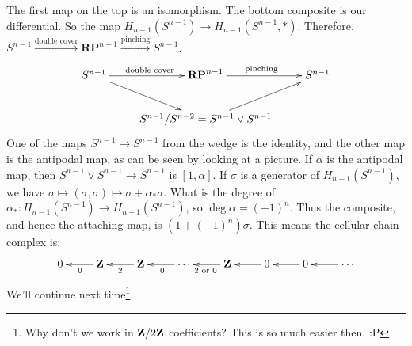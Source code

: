 The first map on the top is an isomorphism. The bottom composite is our differential. So the map $ H_{n-1}(S^{n-1})\to H_{n-1}(S^{n-1},\ast)$. Therefore, $S^{n-1}\xrightarrow{\text{double cover}}\mathbf{RP}^{n-1}\xrightarrow{\text{pinching}} S^{n-1}$.
\begin{equation*}
\xymatrix{S^{n-1}\ar[r]^{\text{double cover}}\ar[dr] & \mathbf{RP}^{n-1}\ar[r]^{\text{pinching}} & S^{n-1}\\
 & S^{n-1}/S^{n-2}=S^{n-1}\vee S^{n-1}\ar[ur]}
\end{equation*}
One of the maps $S^{n-1}\to S^{n-1}$ from the wedge is the identity, and the other map is the antipodal map, as can be seen by looking at a picture. If $\alpha$ is the antipodal map, then $S^{n-1}\vee S^{n-1}\to S^{n-1}$ is $[1,\alpha]$. If $\sigma$ is a generator of $ H_{n-1}(S^{n-1})$, we have $\sigma\mapsto (\sigma,\sigma)\mapsto \sigma+\alpha_\ast\sigma$. What is the degree of $\alpha_\ast: H_{n-1}(S^{n-1})\to H_{n-1}(S^{n-1})$, so $\deg\alpha=(-1)^n$. Thus the composite, and hence the attaching map, is $(1+(-1)^n)\sigma$. This means the cellular chain complex is:
\begin{equation*}
\xymatrix{0 & \Z\ar[l]^0 & \Z\ar[l]^2 & \cdots\ar[l]^0 & \Z\ar[l]^{2\text{ or }0} & 0\ar[l] & 0\ar[l] & \cdots\ar[l]}
\end{equation*}
We'll continue next time\footnote{Why don't we work in $\mathbf Z/2\mathbf Z$ coefficients? This is so much easier then. :P}.
